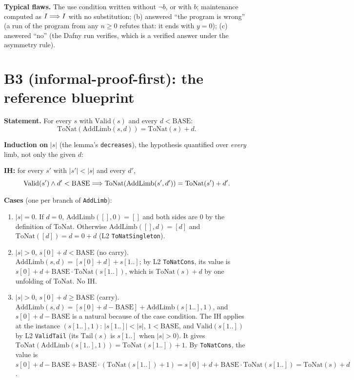 \documentclass[11pt]{article}
\begin{document}
\textbf{Typical flaws.} The use condition written without $\neg b$, or with
$b$; maintenance computed as $I \Longrightarrow I$ with no substitution; (b) answered
``the program is wrong'' (a run of the program from any $n \geq 0$ refutes
that: it ends with $y = 0$); (c) answered ``no'' (the Dafny  run
verifies, which is a verified answer under the asymmetry rule).

\section*{B3 (informal-proof-first): the reference blueprint}

\textbf{Statement.} For every $s$ with $\mathrm{Valid}(s)$ and every
$d < \mathrm{BASE}$:
\[ \mathrm{ToNat}(\mathrm{AddLimb}(s, d)) = \mathrm{ToNat}(s) + d. \]

\textbf{Induction on} $|s|$ (the lemma's \texttt{decreases}), the
hypothesis quantified over \emph{every} limb, not only the given $d$:

\textbf{IH:} for every $s'$ with $|s'| < |s|$ and every $d'$,
\[ \mathrm{Valid}(s') \wedge d' < \mathrm{BASE} \Longrightarrow
\mathrm{ToNat}(\mathrm{AddLimb}(s', d')) = \mathrm{ToNat}(s') + d'. \]

\textbf{Cases} (one per branch of \texttt{AddLimb}):
\begin{enumerate}
\item $|s| = 0$. If $d = 0$, $\mathrm{AddLimb}([], 0) = []$ and both sides are
  $0$ by the definition of ToNat. Otherwise $\mathrm{AddLimb}([], d) = [d]$
  and $\mathrm{ToNat}([d]) = d = 0 + d$ (L2 \texttt{ToNatSingleton}).
\item $|s| > 0$, $s[0] + d < \mathrm{BASE}$ (no carry).
  $\mathrm{AddLimb}(s, d) = [s[0] + d] + s[1..]$; by L2 \texttt{ToNatCons},
  its value is $s[0] + d + \mathrm{BASE}\cdot\mathrm{ToNat}(s[1..])$, which is
  $\mathrm{ToNat}(s) + d$ by one unfolding of ToNat. No IH.
\item $|s| > 0$, $s[0] + d \geq \mathrm{BASE}$ (carry).
  $\mathrm{AddLimb}(s, d) = [s[0] + d - \mathrm{BASE}] + \mathrm{AddLimb}(s[1..], 1)$,
  and $s[0] + d - \mathrm{BASE}$ is a natural because of the case condition.
  The IH applies at the instance $(s[1..], 1)$: $|s[1..]| < |s|$, $1 < \mathrm{BASE}$,
  and $\mathrm{Valid}(s[1..])$ by L2 \texttt{ValidTail} (its $\mathrm{Tail}(s)$
  is $s[1..]$ when $|s| > 0$). It gives
  $\mathrm{ToNat}(\mathrm{AddLimb}(s[1..], 1)) = \mathrm{ToNat}(s[1..]) + 1$.
  By \texttt{ToNatCons}, the value is
  $s[0] + d - \mathrm{BASE} + \mathrm{BASE}\cdot(\mathrm{ToNat}(s[1..]) + 1)
  = s[0] + d + \mathrm{BASE}\cdot\mathrm{ToNat}(s[1..]) = \mathrm{ToNat}(s) + d$.
\end{enumerate}
\end{document}
